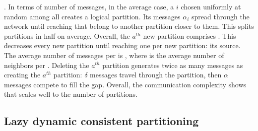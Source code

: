 . In terms of number of messages, in the average
case, a \process $i$ chosen uniformly at random among all \processes
creates a logical partition. Its messages $\alpha_i$ spread through
the network until reaching \processes that belong to another partition
closer to them. This splits partitions in half on average. Overall,
the $a^{th}$ new partition comprises
\processes. This decreases every new partition until reaching one
\process per new partition: its source. The average number of messages
per \process is , where  is the
average number of neighbors per \process.
Deleting the $a^{th}$ partition generates twice as many messages as
creating the $a^{th}$ partition: $\delta$ messages travel through the
partition, then $\alpha$ messages compete to fill the gap.  Overall,
the communication complexity shows that \NAME scales well to the
number of partitions.





\subsection{Lazy dynamic consistent partitioning}
\label{subsec:lazy}

